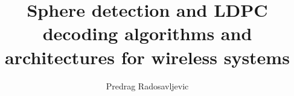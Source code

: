 \documentclass[12pt]{ruthesis}
\title{Sphere detection and LDPC decoding algorithms and architectures for wireless systems}
\author{Predrag Radosavljevic}
\begin{document}
  \begin{frontmatter}
   \maketitle
   \tableofcontents
   \listoffigures
   \listoftables
%   
  \end{frontmatter}




\appendix

%
%
%
%


%
\end{document}
